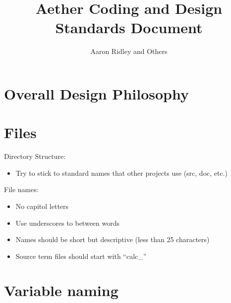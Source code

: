 \documentclass{report}
\begin{document}

\title{Aether Coding and Design Standards Document}
\author{Aaron Ridley and Others}
\maketitle

\tableofcontents
\clearpage

\pagestyle{headings}

\chapter{Overall Design Philosophy}

\chapter{Files}

Directory Structure:
\begin{itemize}
  \item Try to stick to standard names that other projects use (src, doc, etc.)
\end{itemize}

File names:
\begin{itemize}
  \item No capitol letters
  \item Use underscores to between words
  \item Names should be short but descriptive (less than 25 characters)
  \item Source term files should start with ``calc\_''
\end{itemize}
  

\chapter{Variable naming}
\end{document}
